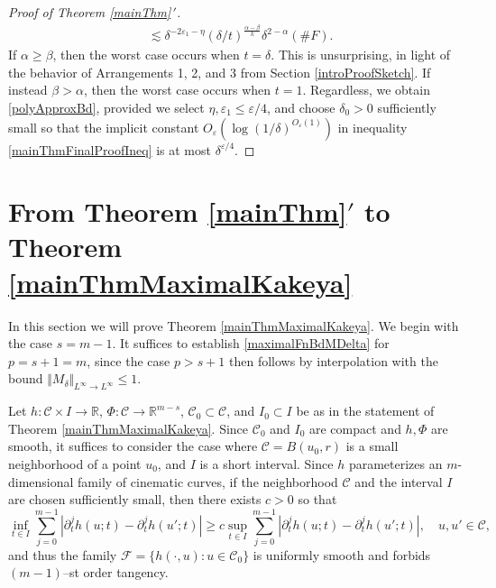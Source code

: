 \documentclass[letterpaper, reqno,11pt]{article}
\numberwithin{equation}{section}
\newcommand{\RR}{\mathbb{R}}
\newcommand{\eps}{\varepsilon}
\numberwithin{thm}{section}
\theoremstyle{remark}
\begin{document}
\begin{proof}[Proof of Theorem \ref{mainThm}\,$'$]
\begin{equation}
\begin{split}
&\lesssim \delta^{-2\eps_1-\eta}(\delta/ t)^{\frac{\alpha-\beta}{k}}\delta^{2 - \alpha}(\# F).
\end{split}
\end{equation}
If $\alpha\geq\beta$, then the worst case occurs when $t=\delta$. This is unsurprising, in light of the behavior of Arrangements 1, 2, and 3 from Section \ref{introProofSketch}. If instead $\beta>\alpha$, then the worst case occurs when $t=1$. Regardless, we obtain \eqref{polyApproxBd}, provided we select $\eta,\eps_1\leq\eps/4$, and choose $\delta_0>0$ sufficiently small so that the implicit constant $O_{\eps}(\log(1/\delta)^{O_\eps(1)})$ in inequality \eqref{mainThmFinalProofIneq} is at most $\delta^{\eps/4}$.
\end{proof}



\section{From Theorem \ref{mainThm}$'$ to Theorem \ref{mainThmMaximalKakeya}}\label{proofOfThmMainThmMaximalKakeyaSection}

In this section we will prove Theorem \ref{mainThmMaximalKakeya}. We begin with the case $s=m-1$. It suffices to establish \eqref{maximalFnBdMDelta} for $p = s+1 = m$, since the case $p>s+1$ then follows by interpolation with the bound $\Vert M_\delta \Vert_{L^\infty\to L^\infty}\leq 1$.

 Let $h\colon \mathcal{C}\times I\to\RR$, $\Phi\colon \mathcal{C}\to\RR^{m-s}$, $\mathcal{C}_0\subset \mathcal{C}$, and $I_0\subset I$ be as in the statement of Theorem \ref{mainThmMaximalKakeya}. Since $\mathcal{C}_0$ and $I_0$ are compact and $h,\Phi$ are smooth, it suffices to consider the case where $\mathcal{C}=B(u_0,r)$ is a small neighborhood of a point $u_0$, and $I$ is a short interval. Since $h$ parameterizes an $m$-dimensional family of cinematic curves, if the neighborhood $\mathcal{C}$ and the interval $I$ are chosen sufficiently small, then there exists $c>0$ so that
\[
\inf_{t\in I}\sum_{j=0}^{m-1} |\partial_t^j h(u;t) - \partial_t^j h(u';t)|\geq c \sup_{t\in I}\sum_{j=0}^{m-1} |\partial_t^j h(u;t) - \partial_t^j h(u';t)|,\quad u,u'\in \mathcal{C},
\]
and thus the family $\mathcal{F} = \{h(\cdot, u)\colon u\in \mathcal{C}_0\}$ is uniformly smooth and forbids $(m-1)$--st order tangency. 
\end{document}
